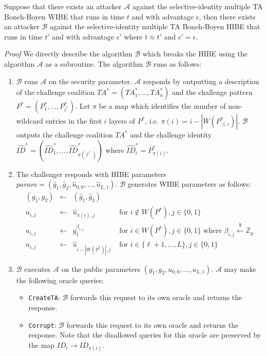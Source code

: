 \documentclass[10pt]{llncs}
\newcommand{\A}{\mathcal{A}}
\newcommand{\B}{\mathcal{B}}
\newcommand{\ID}{\mathit{ID}}
\newcommand{\TA}{\mathit{TA}}
\newcommand{\getsr}{\stackrel{{\scriptscriptstyle\$}}{\gets}}
\begin{document}
\begin{theorem}
Suppose that there exists an attacker $\A$ against the selective-identity multiple TA Boneh-Boyen WIBE that runs in time $t$ and with advantage $\epsilon$, then there exists an attacker $\B$ against the selective-identity multiple TA Boneh-Boyen HIBE that runs in time $t'$ and with advantage $\epsilon'$ where $t \approx t'$ and $\epsilon' = \epsilon$.
\end{theorem}
\emph{Proof} We directly describe the algorithm $\B$ which breaks the HIBE using the algorithm $\A$ as a subroutine. The algorithm $\B$ runs as follows:
\begin{enumerate}
\item $\B$ runs $\A$ on the security parameter. $\A$ responds by outputting a description of the challenge coalition $\TA^{*} = (\TA^{*}_{1},\ldots,\TA^{*}_{n})$ and the challenge pattern $P^{*} = (P^{*}_{1},\ldots,P^{*}_{\ell^{*}})$. Let $\pi$ be a map which identifies the number of non-wildcard entries in the first $i$ layers of $P^{*}$, i.e. $\pi(i) = i - |W(P^{*}_{\leq i})|$. $\B$ outputs the challenge coalition $\TA^{*}$ and the challenge identity $\hat{\ID}^{*}=(\hat{\ID}^{*}_{1},\ldots,\hat{\ID}^{*}_{\pi(\ell^{*})})$ where $\hat{\ID}^{*}_{i} = P^{*}_{\pi(i)}$.
\item The challenger responds with HIBE parameters $\mathit{param} = (\hat{g}_{1},\hat{g}_{2},\hat{u}_{0,0},\ldots,\hat{u}_{L,1})$. $\B$ generates WIBE parameters as follows:
	\begin{displaymath}
	\begin{array}{rcll}
	(g_{1},g_{2}) &\gets& (\hat{g}_{1},\hat{g}_{2})&\\
	u_{i,j} &\gets& \hat{u}_{\pi(i),j} &\mbox{ for } i\notin W(P^{*}), j\in\{0,1\}\\
	u_{i,j} &\gets& g_{1}^{\beta_{i,j}} &\mbox{ for } i\in W(P^{*}), j\in\{0,1\}\mbox{ where } \beta_{i,j}\getsr \mathbb{Z}_{p}\\
	u_{i,j} &\gets& \hat{u}_{i-|W(P^{*})|,j} &\mbox{ for } i\in \{\ell+1,\ldots,L\}, j\in\{0,1\}
	\end{array}
	\end{displaymath}
\item $\B$ executes $\A$ on the public parameters $(g_{1},g_{2},u_{0,0},\ldots,u_{L,1})$. $\A$ may make the following oracle queries:
	\begin{itemize}
	\item \texttt{CreateTA}: $\B$ forwards this request to its own oracle and returns the response.
	\item \texttt{Corrupt}: $\B$ forwards this request to its own oracle and returns the response. Note that the disallowed queries for this oracle are preserved by the map $\ID_i \rightarrow \ID_{\pi(i)}$.

\end{itemize}
\end{enumerate}
\end{document}
